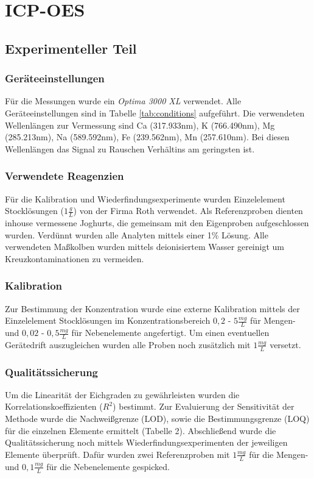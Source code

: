 \newpage

\section{ICP-OES}
\subsection{Experimenteller Teil}

\subsubsection{Geräteeinstellungen}
Für die Messungen wurde ein \textit{Optima 3000 XL} verwendet. Alle Geräteeinstellungen sind in
Tabelle \ref{tab:conditions} aufgeführt. Die verwendeten Wellenlängen zur Vermessung sind Ca (317.933nm),	K (766.490nm),	Mg (285.213nm),	Na (589.592nm),	Fe (239.562nm), Mn (257.610nm). Bei diesen Wellenlängen das Signal zu Rauschen Verhältins am geringsten ist.


\subsubsection{Verwendete Reagenzien}
Für die Kalibration und Wiederfindungsexperimente wurden Einzelelement Stocklösungen ($1 \frac{g}{L}$) von der Firma Roth
verwendet. Als Referenzproben dienten inhouse vermessene Joghurts, die gemeinsam mit
den Eigenproben aufgeschlossen wurden. Verdünnt wurden alle Analyten mittels einer 1\% 
Lösung. Alle verwendeten Maßkolben wurden mittels deionisiertem Wasser gereinigt um Kreuzkontaminationen 
zu vermeiden.

\subsubsection{Kalibration}
Zur Bestimmung der Konzentration wurde eine externe Kalibration mittels der Einzelelement Stocklösungen
im Konzentrationsbereich $0,2$ - $5 \frac{mg}{L}$ für Mengen- und $0,02$ - $0,5 \frac{mg}{L}$ für
Nebenelemente angefertigt. Um einen eventuellen Gerätedrift auszugleichen wurden alle Proben noch zusätzlich mit
$1 \frac{mg}{L}$  versetzt.

\subsubsection{Qualitätssicherung}
Um die Linearität der Eichgraden zu gewährleisten wurden die Korrelationskoeffizienten ($R^2$)
bestimmt. Zur Evaluierung der Sensitivität der Methode wurde die Nachweißgrenze (LOD),
sowie die Bestimmungsgrenze (LOQ) für die einzelnen Elemente ermittelt (Tabelle 2). Abschließend
wurde die Qualitätssicherung noch mittels Wiederfindungsexperimenten der jeweiligen Elemente überprüft.
Dafür wurden zwei Referenzproben mit $1 \frac{mg}{L}$ für die Mengen- und $0,1 \frac{mg}{L}$
für die Nebenelemente gespicked.



